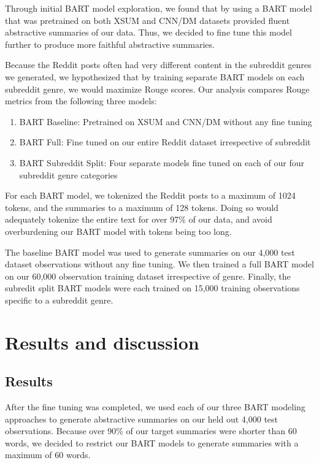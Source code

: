 \documentclass[11pt,a4paper, twocolumn]{article}
\begin{document}
Through initial BART model exploration, we found that by using a BART model that was pretrained on both XSUM and CNN/DM datasets 
provided fluent abstractive summaries of our data. Thus, we decided to fine tune this model further to produce more faithful 
abstractive summaries. 

Because the Reddit posts often had very different content in the subreddit genres we generated, we hypothesized that by training 
separate BART models on each subreddit genre, we would maximize Rouge scores. Our analysis compares Rouge metrics from the following three models:

\begin{enumerate}
  \item BART Baseline: Pretrained on XSUM and CNN/DM without any fine tuning
  \item BART Full: Fine tuned on our entire Reddit dataset irrespective of subreddit
  \item BART Subreddit Split: Four separate models fine tuned on each of our four subreddit genre categories
\end{enumerate}

For each BART model, we tokenized the Reddit posts to a maximum of 1024 tokens, and the summaries to a maximum of 128 tokens. 
Doing so would adequately tokenize the entire text for over 97\% of our data, and avoid overburdening our BART model with tokens being too long. 

The baseline BART model was used to generate summaries on our 4,000 test dataset observations without any fine tuning.
We then trained a full BART model on our 60,000 observation training dataset irrespective of genre. 
Finally, the subredit split BART models were each trained on 15,000 training observations specific to a subreddit genre. 



\section{Results and discussion}

\subsection{Results}

After the fine tuning was completed, we used each of our three BART modeling approaches to generate abstractive summaries on 
our held out 4,000 test observations. Because over 90\% of our target summaries were shorter than 60 words, we decided to 
restrict our BART models to generate summaries with a maximum of 60 words. 
\end{document}
